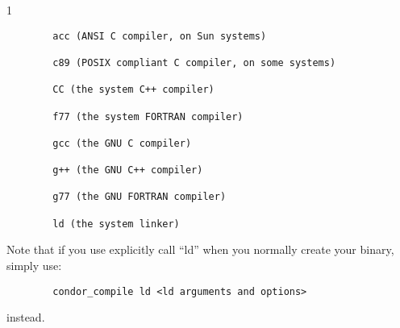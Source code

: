 \begin{ManPage}{\label{man-condor-compile}}{1}
\begin{verbatim}
        acc (ANSI C compiler, on Sun systems) 

        c89 (POSIX compliant C compiler, on some systems) 

        CC (the system C++ compiler) 

        f77 (the system FORTRAN compiler) 

        gcc (the GNU C compiler) 

        g++ (the GNU C++ compiler) 

        g77 (the GNU FORTRAN compiler) 

        ld (the system linker) 
\end{verbatim}

Note that if you use explicitly call ``ld'' when you normally create
your binary, simply use:
\begin{verbatim}
        condor_compile ld <ld arguments and options>
\end{verbatim}
instead.  

\end{ManPage}
